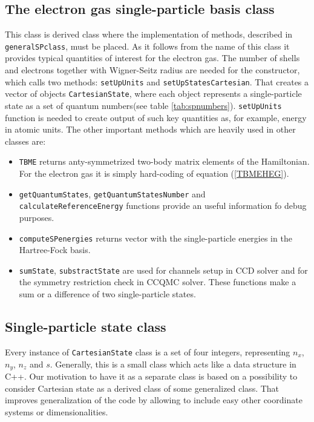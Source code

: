\documentclass[twoside,english]{uiofysmaster}
\newcommand{\classname}[1]{\texttt{#1}}
\begin{document}
\subsection{The electron gas single-particle basis class}
	This class is derived class where the implementation of methods, described in \classname{generalSPclass},
	must be placed. As it follows from the name of this class it provides typical quantities of interest for the electron gas. The number of shells and electrons together with Wigner-Seitz radius are needed for the constructor, which calls two methods: \classname{setUpUnits} and \classname{setUpStatesCartesian}. That creates a vector of objects \classname{CartesianState}, where each object represents a single-particle state as a set of quantum numbers(see table \ref{tab:spnumbers}).
	 \classname{setUpUnits} function is needed to create output of such key quantities as, for example, energy in atomic units. The other important methods which are heavily used in other classes are:
\begin{itemize}
\item \classname{TBME} returns anty-symmetrized two-body matrix elements of the Hamiltonian. For the electron gas it is simply hard-coding of equation (\ref{TBMEHEG}).
\item \classname{getQuantumStates}, \classname{getQuantumStatesNumber} and \\ \classname{calculateReferenceEnergy} functions provide an useful information fo debug purposes.
\item \classname{computeSPenergies} returns vector with the single-particle energies in the Hartree-Fock basis.
\item \classname{sumState}, \classname{substractState} are used for channels setup in CCD solver and for the symmetry restriction check in CCQMC solver. These functions make a sum or a difference of two single-particle states. 
\end{itemize}


\subsection{Single-particle state class}
Every instance of \classname{CartesianState} class is a set of four integers, representing $n_x$, $n_y$, $n_z$ and $s$. Generally, this is a small class which acts like a data structure in C++. Our motivation to have it as a separate class is based on a possibility to consider Cartesian state as a derived class of some generalized class. That improves generalization of the code by allowing to include easy other coordinate systems or dimensionalities.
\end{document}
